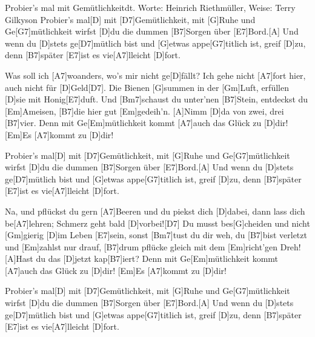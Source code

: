 \documentclass[../main.tex]{subfiles}
\begin{document}
\begin{song}{Probier's mal mit Gemütlichkeit}{dt. Worte: Heinrich Riethmüller, Weise: Terry Gilkyson}{}
Probier’s mal[D] mit [D7]Gemütlichkeit,
mit [G]Ruhe und Ge[G7]mütlichkeit wirfst [D]du die dummen [B7]Sorgen über [E7]Bord.[A]{\hh}
Und wenn du [D]stets ge[D7]mütlich bist und [G]etwas appe[G7]titlich ist,
greif [D]zu, denn [B7]später [E7]ist es vie[A7]lleicht [D]fort.

Was soll ich [A7]woanders, wo's mir nicht ge[D]fällt?
Ich gehe nicht [A7]fort hier, auch nicht für [D]Geld[D7].
Die Bienen [G]summen in der [Gm]Luft, erfüllen [D]sie mit Honig[E7]duft.
Und [Bm7]schaust du unter’nen [B7]Stein, entdeckst du [Em]Ameisen,
[B7]die hier gut [Em]gedeih’n. [A]Nimm [D]da von zwei, drei [B7]vier.
Denn mit Ge[Em]mütlichkeit kommt [A7]auch das Glück zu [D]dir! [Em]Es [A7]kommt zu [D]dir!

Probier’s mal[D] mit [D7]Gemütlichkeit,
mit [G]Ruhe und Ge[G7]mütlichkeit wirfst [D]du die dummen [B7]Sorgen über [E7]Bord.[A]{\hh}
Und wenn du [D]stets ge[D7]mütlich bist und [G]etwas appe[G7]titlich ist,
greif [D]zu, denn [B7]später [E7]ist es vie[A7]lleicht [D]fort.

Na, und pflückst du gern [A7]Beeren und du piekst dich [D]dabei,
dann lass dich be[A7]lehren; Schmerz geht bald [D]vorbei![D7]{\hh}
Du musst bes[G]cheiden und nicht [Gm]gierig [D]im Leben [E7]sein,
sonst [Bm7]tust du dir weh, du [B7]bist verletzt und [Em]zahlst nur drauf,
[B7]drum pflücke gleich mit dem [Em]richt’gen Dreh!
[A]Hast du das [D]jetzt kap[B7]iert?
Denn mit Ge[Em]mütlichkeit kommt [A7]auch das Glück zu [D]dir! [Em]Es [A7]kommt zu [D]dir!

Probier’s mal[D] mit [D7]Gemütlichkeit,
mit [G]Ruhe und Ge[G7]mütlichkeit wirfst [D]du die dummen [B7]Sorgen über [E7]Bord.[A]{\hh}
Und wenn du [D]stets ge[D7]mütlich bist und [G]etwas appe[G7]titlich ist,
greif [D]zu, denn [B7]später [E7]ist es vie[A7]lleicht [D]fort.
\end{song}
\end{document}
